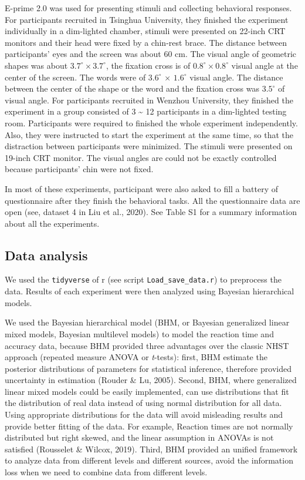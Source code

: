 \documentclass[
  english,
  man]{apa6}
\begin{document}
E-prime 2.0 was used for presenting stimuli and collecting behavioral responses. For participants recruited in Tsinghua University, they finished the experiment individually in a dim-lighted chamber, stimuli were presented on 22-inch CRT monitors and their head were fixed by a chin-rest brace. The distance between participants' eyes and the screen was about 60 cm. The visual angle of geometric shapes was about \(3.7^\circ × 3.7^\circ\), the fixation cross is of \(0.8^\circ × 0.8^\circ\) visual angle at the center of the screen. The words were of \(3.6^\circ\) × \(1.6^\circ\) visual angle. The distance between the center of the shape or the word and the fixation cross was \(3.5^\circ\) of visual angle. For participants recruited in Wenzhou University, they finished the experiment in a group consisted of 3 \textasciitilde{} 12 participants in a dim-lighted testing room. Participants were required to finished the whole experiment independently. Also, they were instructed to start the experiment at the same time, so that the distraction between participants were minimized. The stimuli were presented on 19-inch CRT monitor. The visual angles are could not be exactly controlled because participants' chin were not fixed.

In most of these experiments, participant were also asked to fill a battery of questionnaire after they finish the behavioral tasks. All the questionnaire data are open (see, dataset 4 in Liu et al., 2020). See Table S1 for a summary information about all the experiments.

\hypertarget{data-analysis}{%
\subsection{Data analysis}\label{data-analysis}}

We used the \texttt{tidyverse} of r (see script \texttt{Load\_save\_data.r}) to preprocess the data. Results of each experiment were then analyzed using Bayesian hierarchical models.

We used the Bayesian hierarchical model (BHM, or Bayesian generalized linear mixed models, Bayesian multilevel models) to model the reaction time and accuracy data, because BHM provided three advantages over the classic NHST approach (repeated measure ANOVA or \emph{t}-tests): first, BHM estimate the posterior distributions of parameters for statistical inference, therefore provided uncertainty in estimation (Rouder \& Lu, 2005). Second, BHM, where generalized linear mixed models could be easily implemented, can use distributions that fit the distribution of real data instead of using normal distribution for all data. Using appropriate distributions for the data will avoid misleading results and provide better fitting of the data. For example, Reaction times are not normally distributed but right skewed, and the linear assumption in ANOVAs is not satisfied (Rousselet \& Wilcox, 2019). Third, BHM provided an unified framework to analyze data from different levels and different sources, avoid the information loss when we need to combine data from different levels.
\end{document}
